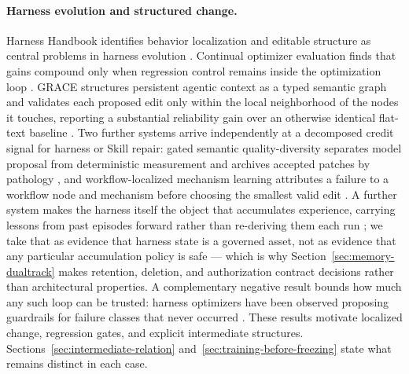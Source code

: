 \documentclass[11pt]{article}
\begin{document}
\paragraph{Harness evolution and structured change.}
Harness Handbook identifies behavior localization and editable structure as central problems in harness evolution \cite{wang2026handbook}. Continual optimizer evaluation finds that gains compound only when regression control remains inside the optimization loop \cite{wang2026compound}. GRACE structures persistent agentic context as a typed semantic graph and validates each proposed edit only within the local neighborhood of the nodes it touches, reporting a substantial reliability gain over an otherwise identical flat-text baseline \cite{hsu2026grace}. Two further systems arrive independently at a decomposed credit signal for harness or Skill repair: gated semantic quality-diversity separates model proposal from deterministic measurement and archives accepted patches by pathology \cite{luo2026gsme}, and workflow-localized mechanism learning attributes a failure to a workflow node and mechanism before choosing the smallest valid edit \cite{lin2026wml}. A further system makes the harness itself the object that accumulates experience, carrying lessons from past episodes forward rather than re-deriving them each run \cite{huang2026memoharness}; we take that as evidence that harness state is a governed asset, not as evidence that any particular accumulation policy is safe --- which is why Section~\ref{sec:memory-dualtrack} makes retention, deletion, and authorization contract decisions rather than architectural properties. A complementary negative result bounds how much any such loop can be trusted: harness optimizers have been observed proposing guardrails for failure classes that never occurred \cite{wang2026phantom}. These results motivate localized change, regression gates, and explicit intermediate structures. Sections~\ref{sec:intermediate-relation} and~\ref{sec:training-before-freezing} state what remains distinct in each case.
\end{document}

